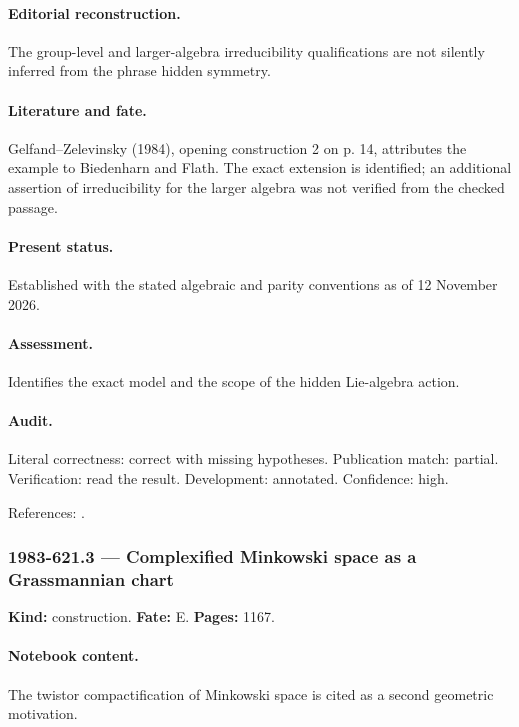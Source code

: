 \paragraph{Editorial reconstruction.} The group-level and larger-algebra irreducibility qualifications are not silently inferred from the phrase hidden symmetry.

\paragraph{Literature and fate.} Gelfand–Zelevinsky (1984), opening construction 2 on p. 14, attributes the example to Biedenharn and Flath. The exact extension is identified; an additional assertion of irreducibility for the larger algebra was not verified from the checked passage.

\paragraph{Present status.} Established with the stated algebraic and parity conventions as of 12 November 2026.

\paragraph{Assessment.} Identifies the exact model and the scope of the hidden Lie-algebra action.

\paragraph{Audit.} Literal correctness: correct with missing hypotheses. Publication match: partial. Verification: read the result. Development: annotated. Confidence: high.

\noindent References: \citep{gelfandzelevinsky1984models}.\par

\subsubsection{1983-621.3 --- Complexified Minkowski space as a Grassmannian chart}

\label{item:1983-621.3}

\noindent\textbf{Kind:} construction. \textbf{Fate:} E. \textbf{Pages:} 1167.\par

\paragraph{Notebook content.} The twistor compactification of Minkowski space is cited as a second geometric motivation.

